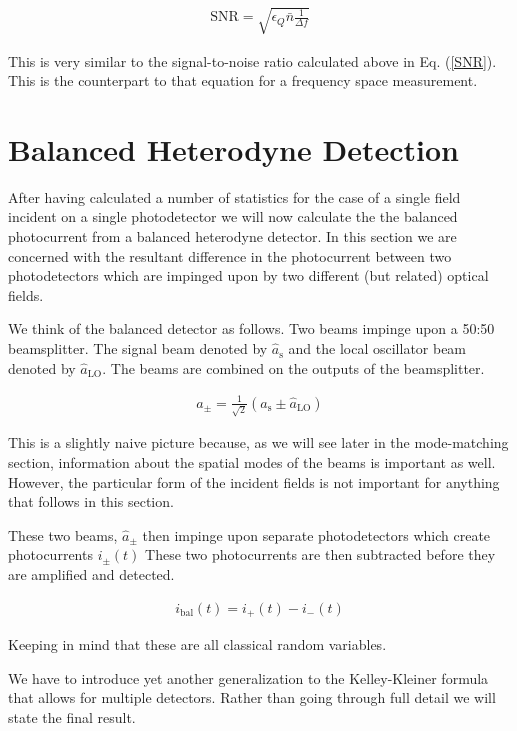 \documentclass[12pt]{article}
\newcommand{\ep}{\epsilon}
\begin{document}
\begin{align}
\text{SNR} = \sqrt{\ep_Q \bar{n} \frac{1}{\Delta f}}
\end{align}

This is very similar to the signal-to-noise ratio calculated above in Eq. (\ref{SNR}). This is the counterpart to that equation for a frequency space measurement.

\section{Balanced Heterodyne Detection}

After having calculated a number of statistics for the case of a single field incident on a single photodetector we will now calculate the the balanced photocurrent from a balanced heterodyne detector. In this section we are concerned with the resultant difference in the photocurrent between two photodetectors which are impinged upon by two different (but related) optical fields.

We think of the balanced detector as follows. Two beams impinge upon a 50:50 beamsplitter. The signal beam denoted by $\hat{a}_{\text{s}}$ and the local oscillator beam denoted by $\hat{a}_{\text{LO}}$. The beams are combined on the outputs of the beamsplitter.

\begin{align}
\label{balphoton}
a_{\pm} = \frac{1}{\sqrt{2}}\left(\hat{a}_{\text{s}} \pm \hat{a}_{\text{LO}}\right)
\end{align}

This is a slightly naive picture because, as we will see later in the mode-matching section, information about the spatial modes of the beams is important as well. However, the particular form of the incident fields is not important for anything that follows in this section.

These two beams, $\hat{a}_{\pm}$ then impinge upon separate photodetectors which create photocurrents $i_{\pm}(t)$ These two photocurrents are then subtracted before they are amplified and detected.

\begin{align}
i_{\text{bal}}(t) = i_+(t) - i_-(t)
\end{align}

Keeping in mind that these are all classical random variables. 

We have to introduce yet another generalization to the Kelley-Kleiner formula that allows for multiple detectors. Rather than going through full detail we will state the final result.
\end{document}
